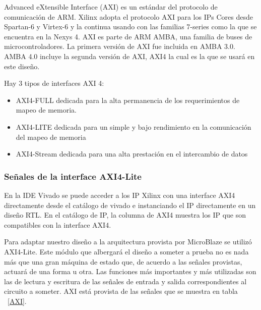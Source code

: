 \documentclass[a4paper,openright,12pt]{report}
\begin{document}
Advanced eXtensible Interface (AXI) es un estándar del protocolo de comunicación de ARM. Xilinx adopta el protocolo AXI para los IPs Cores desde Spartan-6 y Virtex-6 y la continua usando con las familias 7-series como la que se encuentra en la Nexys 4. 
AXI es parte de ARM AMBA, una familia de buses de microcontroladores. La primera versión de AXI fue incluida en AMBA 3.0. AMBA 4.0 incluye la segunda versión de AXI, AXI4 la cual es la que se usará en este diseño.
 

 
Hay 3 tipos de interfaces AXI 4:

\begin{itemize}
\item AXI4-FULL dedicada para la alta permanencia de los requerimientos de mapeo de memoria.
\item AXI4-LITE  dedicada para un simple y bajo rendimiento en la comunicación del mapeo de memoria 
\item AXI4-Stream dedicada para una alta prestación en el intercambio de datos
\end{itemize}

\subsubsection{ Señales de la interface AXI4-Lite}

En la IDE Vivado se puede acceder a los IP Xilinx con una interface AXI4 directamente desde el catálogo de vivado e instanciando el IP directamente en un diseño RTL. En el catálogo  de IP, la columna de AXI4 muestra los IP que son compatibles con la interface AXI4.

Para adaptar nuestro diseño a la arquitectura provista por MicroBlaze se utilizó AXI4-Lite. Este módulo que albergará el diseño a someter a prueba no es nada más que una gran máquina de estado que, de acuerdo a las señales provistas, actuará de una forma u otra. Las funciones más importantes y  más utilizadas son las de lectura y escritura de las señales de entrada y salida correspondientes al circuito a someter.
AXI está provista de las señales que se muestra en  tabla ~\ref{AXI}.
\end{document}
